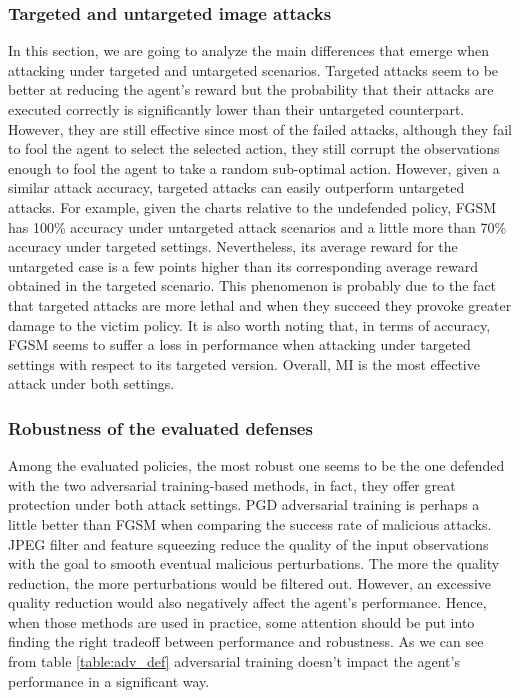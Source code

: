 \subsubsection{Targeted and untargeted image attacks}
In this section, we are going to analyze the main differences that emerge when attacking under targeted and untargeted scenarios. Targeted attacks seem to be better at reducing the agent's reward but the probability that their attacks are executed correctly is significantly lower than their untargeted counterpart. However, they are still effective since most of the failed attacks, although they fail to fool the agent to select the selected action, they still corrupt the observations enough to fool the agent to take a random sub-optimal action. However, given a similar attack accuracy, targeted attacks can easily outperform untargeted attacks. For example, given the charts relative to the undefended policy, FGSM has 100\% accuracy under untargeted attack scenarios and a little more than 70\% accuracy under targeted settings. Nevertheless, its average reward for the untargeted case is a few points higher than its corresponding average reward obtained in the targeted scenario. This phenomenon is probably due to the fact that targeted attacks are more lethal and when they succeed they provoke greater damage to the victim policy. It is also worth noting that, in terms of accuracy, FGSM seems to suffer a loss in performance when attacking under targeted settings with respect to its targeted version. Overall, MI is the most effective attack under both settings. 

\subsubsection{Robustness of the evaluated defenses}
Among the evaluated policies, the most robust one seems to be the one defended with the two adversarial training-based methods, in fact, they offer great protection under both attack settings. PGD adversarial training is perhaps a little better than FGSM when comparing the success rate of malicious attacks. JPEG filter and feature squeezing reduce the quality of the input observations with the goal to smooth eventual malicious perturbations. The more the quality reduction, the more perturbations would be filtered out. However, an excessive quality reduction would also negatively affect the agent's performance. Hence, when those methods are used in practice, some attention should be put into finding the right tradeoff between performance and robustness. As we can see from table \ref{table:adv_def} adversarial training doesn't impact the agent's performance in a significant way. 

